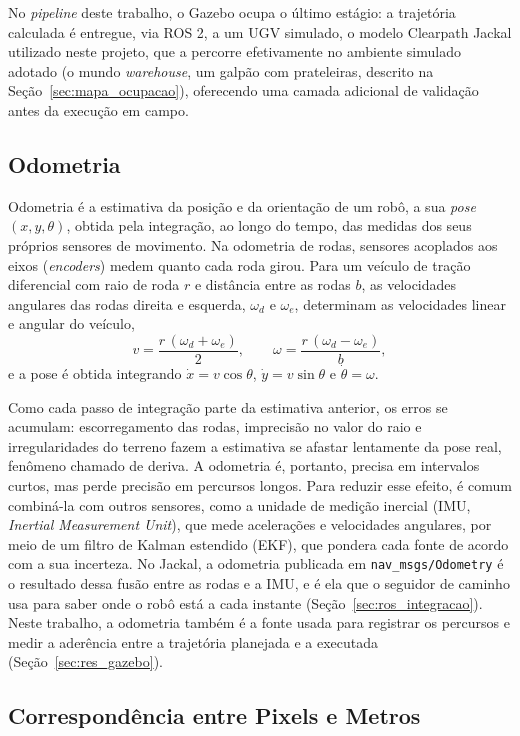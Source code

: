 \documentclass[
    12pt,
    openright,
    oneside,
    a4paper,
    english,
    brazil
]{abntex2}
\begin{document}
No \textit{pipeline} deste trabalho, o Gazebo ocupa o último estágio: a trajetória calculada é entregue, via ROS 2, a um UGV simulado, o modelo Clearpath Jackal utilizado neste projeto, que a percorre efetivamente no ambiente simulado adotado (o mundo \textit{warehouse}, um galpão com prateleiras, descrito na Seção~\ref{sec:mapa_ocupacao}), oferecendo uma camada adicional de validação antes da execução em campo.

\subsection{Odometria}
\label{sec:odometria}

Odometria é a estimativa da posição e da orientação de um robô, a sua \emph{pose} $(x, y, \theta)$, obtida pela integração, ao longo do tempo, das medidas dos seus próprios sensores de movimento. Na odometria de rodas, sensores acoplados aos eixos (\textit{encoders}) medem quanto cada roda girou. Para um veículo de tração diferencial com raio de roda $r$ e distância entre as rodas $b$, as velocidades angulares das rodas direita e esquerda, $\omega_d$ e $\omega_e$, determinam as velocidades linear e angular do veículo,
\[
v = \frac{r\,(\omega_d + \omega_e)}{2}, \qquad \omega = \frac{r\,(\omega_d - \omega_e)}{b},
\]
e a pose é obtida integrando $\dot{x} = v \cos\theta$, $\dot{y} = v \sin\theta$ e $\dot{\theta} = \omega$.

Como cada passo de integração parte da estimativa anterior, os erros se acumulam: escorregamento das rodas, imprecisão no valor do raio e irregularidades do terreno fazem a estimativa se afastar lentamente da pose real, fenômeno chamado de deriva. A odometria é, portanto, precisa em intervalos curtos, mas perde precisão em percursos longos. Para reduzir esse efeito, é comum combiná-la com outros sensores, como a unidade de medição inercial (IMU, \textit{Inertial Measurement Unit}), que mede acelerações e velocidades angulares, por meio de um filtro de Kalman estendido (EKF), que pondera cada fonte de acordo com a sua incerteza. No Jackal, a odometria publicada em \texttt{nav\_\allowbreak{}msgs/\allowbreak{}Odometry} é o resultado dessa fusão entre as rodas e a IMU, e é ela que o seguidor de caminho usa para saber onde o robô está a cada instante (Seção~\ref{sec:ros_integracao}). Neste trabalho, a odometria também é a fonte usada para registrar os percursos e medir a aderência entre a trajetória planejada e a executada (Seção~\ref{sec:res_gazebo}).

\subsection{Correspondência entre Pixels e Metros}
\label{sec:gsd}
\end{document}

